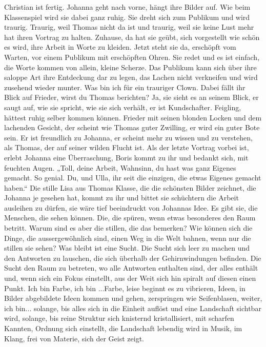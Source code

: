 Christian ist fertig. Johanna geht nach vorne, hängt ihre Bilder auf. Wie beim Klassenspiel wird sie dabei ganz ruhig. Sie dreht sich zum Publikum und wird traurig. Traurig, weil Thomas nicht da ist und traurig, weil sie keine Lust mehr hat ihren Vortrag zu halten. Zuhause, da hat sie geübt, sich vorgestellt wie schön es wird, ihre Arbeit in Worte zu kleiden. Jetzt steht sie da, erschöpft vom Warten, vor einem Publikum mit erschöpften Ohren.
Sie redet und es ist einfach, die Worte kommen von allein, kleine Scherze. Das Publikum kann sich über ihre saloppe Art ihre Entdeckung dar zu legen, das Lachen nicht verkneifen und wird zusehend wieder munter. Was bin ich für ein trauriger Clown. Dabei fällt ihr Blick auf Frieder, wirst du Thomas berichten? Ja, sie sieht es an seinem Blick, er saugt auf, wie sie spricht, wie sie sich verhält, er ist Kundschafter. Feigling, hättest ruhig selber kommen können. Frieder mit seinen blonden Locken und dem lachenden Gesicht, der scheint wie Thomas guter Zwilling, er wird ein guter Bote sein. Er ist freundlich zu Johanna, er scheint mehr zu wissen und zu verstehen, als Thomas, der auf seiner wilden Flucht ist.
Als der letzte Vortrag vorbei ist, erlebt Johanna eine Überraschung, Boris kommt zu ihr und bedankt sich, mit feuchten Augen. „Toll, deine Arbeit, Wahnsinn, du hast was ganz Eigenes gemacht. So genial. Du, und Ulla, ihr seit die einzigen, die etwas Eigenes gemacht haben.“ Die stille Lisa aus Thomas Klasse, die die schönsten Bilder zeichnet, die Johanna je gesehen hat, kommt zu ihr und bittet sie schüchtern die Arbeit ausleihen zu dürfen, sie wäre tief beeindruckt von Johannas Idee. Es gibt sie, die Menschen, die sehen können. Die, die spüren, wenn etwas besonderes den Raum betritt. Warum sind es aber die stillen, die das bemerken? Wie können sich die Dinge, die aussergewöhnlich sind, einen Weg in die Welt bahnen, wenn nur die stillen sie  sehen?
Was bleibt ist eine Sucht. Die Sucht sich leer zu machen und den Antworten zu lauschen, die sich überhalb der Gehirnwindungen befinden. Die Sucht den Raum zu betreten, wo alle Antworten enthalten sind, der alles enthält und, wenn sich ein Fokus einstellt, aus der Weit sich hin spiralt auf diesen einen Punkt. 
Ich bin Farbe, ich bin ...Farbe, leise beginnt es zu vibrieren, Ideen, in Bilder abgebildete Ideen kommen und gehen, zerspringen wie Seifenblasen, weiter, ich bin... solange, bis alles sich in die Einheit auflöst und eine Landschaft sichtbar wird, solange, bis reine Struktur sich knisternd kristallisiert, mit scharfen Kannten, Ordnung sich einstellt, die Landschaft lebendig wird in Musik, im Klang, frei von Materie, sich der Geist zeigt.
